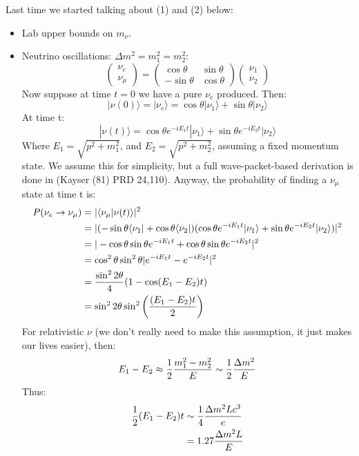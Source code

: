 \documentclass{article}
\def\hf{\frac12}
\def\hf{\frac12}
\begin{document}
\def\ket#1{|#1\rangle}
\def\bra#1{\langle #1|}
\def\mean#1{\langle #1\rangle}
Last time we started talking about (1) and (2) below:
\begin{itemize}
\item Lab upper bounds on $m_\nu$.
\item Neutrino oscillations: $\Delta m^2=m_1^2=m_2^2$:
$$\begin{pmatrix} \nu_e\\\nu_\mu\end{pmatrix}=\begin{pmatrix}\cos\theta&\sin\theta\\
-\sin\theta&\cos\theta\end{pmatrix}\begin{pmatrix}\nu_1\\\nu_2\end{pmatrix}$$
Now suppose at time $t=0$ we have a pure $\nu_e$ produced.  Then:
$$\ket{\nu(0)}=\ket{\nu_e}=\cos\theta\ket{\nu_1}+\sin\theta\ket{\nu_2}$$
At time t:
$$\ket{\nu(t)}=\cos\theta e^{-iE_1t}\ket{\nu_1}+\sin\theta 
e^{-iE_2t}\ket{\nu_2}$$
Where $E_1=\sqrt{p^2+m_1^2}$, and $E_2=\sqrt{p^2+m_2^2}$, assuming a fixed
momentum state.  We assume this for simplicity, but a full wave-packet-based
derivation is done in (Kayser (81) PRD 24,110).  Anyway, the probability 
of finding a $\nu_\mu$ state at time t is:
\def\ieot{{-iE_1t}}
\def\iett{{-iE_2t}}
\begin{align}
P(\nu_e\to\nu_\mu)&=|\mean{\nu_\mu|\nu(t)}|^2\\
&=|(-\sin\theta\bra{\nu_1}+\cos\theta\bra{\nu_2})
(\cos\theta e^\ieot\ket{\nu_1}+\sin\theta e^\iett\ket{\nu_2})|^2\\
&=|-\cos\theta\sin\theta e^\ieot+\cos\theta\sin\theta e^\iett|^2\\
&=\cos^2\theta\sin^2\theta|e^\ieot-e^\iett|^2\\
&={\sin^22\theta\over4}(1-\cos(E_1-E_2)t)\\
&=\sin^22\theta\sin^2\left({(E_1-E_2)t\over2}\right)\\
\end{align}
For relativistic $\nu$ (we don't really need to make this assumption, it just
makes our lives easier), then:
$$E_1-E_2\approx\hf{m_1^2-m_2^2\over E}\sim\hf{\Delta m^2\over E}$$
Thus:
\begin{align}
\hf(E_1-E_2)t&\sim{1\over4}{\Delta m^2Lc^3\over e}\\
&=1.27{\Delta m^2L\over E}\\
\end{align}

\end{itemize}
\end{document}
